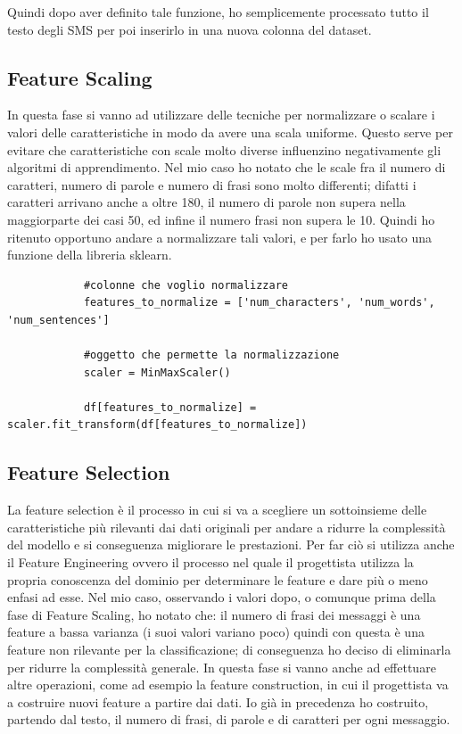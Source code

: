 \documentclass[]{article}
\begin{document}
        Quindi dopo aver definito tale funzione, ho semplicemente processato tutto il testo degli SMS per poi inserirlo in una nuova colonna del dataset.

    \subsection{Feature Scaling}
        In questa fase si vanno ad utilizzare delle tecniche per normalizzare o scalare i valori delle caratteristiche in modo da avere una scala uniforme. Questo serve per evitare che caratteristiche con scale molto diverse influenzino negativamente gli algoritmi di apprendimento. Nel mio caso ho notato che le scale fra il numero di caratteri, numero di parole e numero di frasi sono molto differenti; difatti i caratteri arrivano anche a oltre 180, il numero di parole non supera nella maggiorparte dei casi 50, ed infine il numero frasi non supera le 10. Quindi ho ritenuto opportuno andare a normalizzare tali valori, e per farlo ho usato una funzione della libreria sklearn.
        \begin{verbatim}
            #colonne che voglio normalizzare
            features_to_normalize = ['num_characters', 'num_words', 'num_sentences']

            #oggetto che permette la normalizzazione
            scaler = MinMaxScaler()

            df[features_to_normalize] = scaler.fit_transform(df[features_to_normalize])
        \end{verbatim}

        \subsection{Feature Selection}
            La feature selection è il processo in cui si va a scegliere un sottoinsieme delle caratteristiche più rilevanti dai dati originali per andare a ridurre la complessità del modello e si conseguenza migliorare le prestazioni. Per far ciò si utilizza anche il Feature Engineering ovvero il processo nel quale il progettista utilizza la propria conoscenza del dominio per determinare le feature e dare più o meno enfasi ad esse. Nel mio caso, osservando i valori dopo, o comunque prima della fase di Feature Scaling, ho notato che: il numero di frasi dei messaggi è una feature a bassa varianza (i suoi valori variano poco) quindi con questa è una feature non rilevante per la classificazione; di conseguenza ho deciso di eliminarla per ridurre la complessità generale. In questa fase si vanno anche ad effettuare altre operazioni, come ad esempio la feature construction, in cui il progettista va a costruire nuovi feature a partire dai dati. Io già in precedenza ho costruito, partendo dal testo, il numero di frasi, di parole e di caratteri per ogni messaggio.
\end{document}
